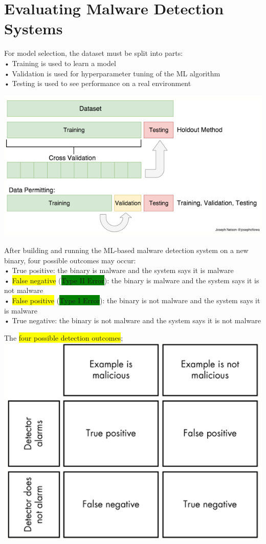 \documentclass[]{project_plan}
\begin{document}
\section{Evaluating Malware Detection Systems}

For model selection, the dataset must be split into parts:\\
• Training is used to learn a model\\
• Validation is used for hyperparameter tuning of the ML algorithm\\
• Testing is used to see performance on a real environment

\includegraphics[width=.6\linewidth]{92ml.png}

After building and running the ML-based malware detection system on a new binary,
four possible outcomes may occur:\\
• True positive: the binary is malware and the system says it is malware\\
• \colorbox{yellow}{False negative} (\colorbox{green}{Type II Error}): the binary is malware and the system says it is not malware\\
• \colorbox{yellow}{False positive} (\colorbox{green}{Type I Error}): the binary is not malware and the system says it is malware\\
• True negative: the binary is not malware and the system says it is not malware

The \colorbox{yellow}{four possible detection outcomes};\\
\includegraphics[width=.6\linewidth]{94ml.png}
\end{document}
